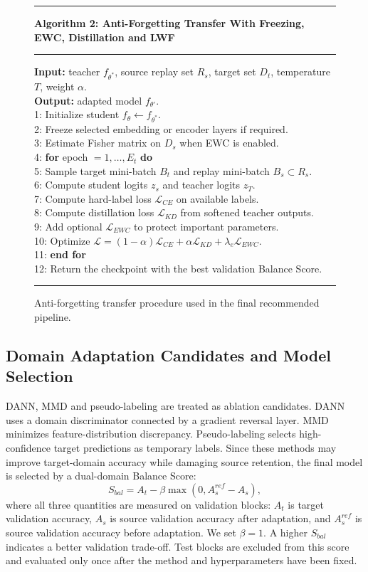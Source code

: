 \documentclass[conference,letterpaper]{IEEEtran}\IEEEoverridecommandlockouts
\newcommand{\algorule}{\noindent\rule{\linewidth}{0.6pt}}
\newenvironment{algorithmblock}[1]{%
    \begin{minipage}{0.98\linewidth}
    \algorule\vspace{2pt}
    {\small\textbf{#1}}\par\vspace{2pt}
    \algorule\vspace{2pt}
    \footnotesize
}{%
    \vspace{2pt}\algorule
    \end{minipage}
}
\begin{document}
\begin{figure}[!t]
\centering
\begin{algorithmblock}{Algorithm 2: Anti-Forgetting Transfer With Freezing, EWC, Distillation and LWF}
\textbf{Input:} teacher $f_{\theta^*}$, source replay set $R_s$, target set $D_t$, temperature $T$, weight $\alpha$.\\
\textbf{Output:} adapted model $f_{\theta'}$.\\[1mm]
1: Initialize student $f_\theta \leftarrow f_{\theta^*}$.\\
2: Freeze selected embedding or encoder layers if required.\\
3: Estimate Fisher matrix on $D_s$ when EWC is enabled.\\
4: \textbf{for} epoch $=1,\ldots,E_t$ \textbf{do}\\
5: \quad Sample target mini-batch $B_t$ and replay mini-batch $B_s\subset R_s$.\\
6: \quad Compute student logits $z_s$ and teacher logits $z_T$.\\
7: \quad Compute hard-label loss $\mathcal{L}_{CE}$ on available labels.\\
8: \quad Compute distillation loss $\mathcal{L}_{KD}$ from softened teacher outputs.\\
9: \quad Add optional $\mathcal{L}_{EWC}$ to protect important parameters.\\
10: \quad Optimize $\mathcal{L}=(1-\alpha)\mathcal{L}_{CE}+\alpha\mathcal{L}_{KD}+\lambda_e\mathcal{L}_{EWC}$.\\
11: \textbf{end for}\\
12: Return the checkpoint with the best validation Balance Score.
\end{algorithmblock}
\caption{Anti-forgetting transfer procedure used in the final recommended pipeline.}
\label{alg:antiforgetting}
\end{figure}

\subsection{Domain Adaptation Candidates and Model Selection}
DANN, MMD and pseudo-labeling are treated as ablation candidates. DANN uses a domain discriminator connected by a gradient reversal layer. MMD minimizes feature-distribution discrepancy. Pseudo-labeling selects high-confidence target predictions as temporary labels. Since these methods may improve target-domain accuracy while damaging source retention, the final model is selected by a dual-domain Balance Score:
\begin{equation}
S_{bal}=A_t-\beta \max(0,A_s^{ref}-A_s),
\end{equation}
where all three quantities are measured on validation blocks: $A_t$ is target validation accuracy, $A_s$ is source validation accuracy after adaptation, and $A_s^{ref}$ is source validation accuracy before adaptation. We set $\beta=1$. A higher $S_{bal}$ indicates a better validation trade-off. Test blocks are excluded from this score and evaluated only once after the method and hyperparameters have been fixed.
\end{document}
